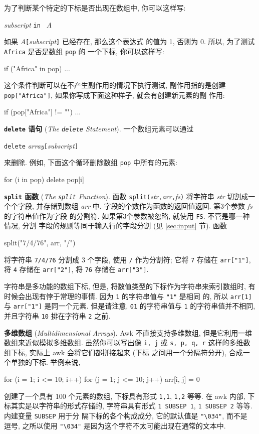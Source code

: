 为了判断某个特定的下标是否出现在数组中, 你可以这样写:
\begin{pattern}
    \textit{subscript} \verb'in ' \textit{A}
\end{pattern}
如果 \textit{A}\verb'['\textit{subscript}\verb']' 已经存在, 那么这个表达式
的值为 1, 否则为 0. 所以, 为了测试 \verb'Africa' 是否是数组 \verb'pop' 的
一个下标, 你可以这样写:
\begin{awkcode}
    if ("Africa" in pop) ...
\end{awkcode}
这个条件判断可以在不产生副作用的情况下执行测试, 副作用指的是创建
\verb'pop["Africa"]', 如果你写成下面这种样子, 就会有创建新元素的副
作用:
\begin{awkcode}
    if (pop["Africa"] != "") ...
\end{awkcode}

\textbf{\texttt{delete} 语句} (\emph{The \texttt{delete} Statement}).
一个数组元素可以通过
\begin{pattern}
    \verb'delete' \textit{array}\verb'['\textit{subscript}\verb']'
\end{pattern}
来删除. 例如, 下面这个循环删除数组 \verb'pop' 中所有的元素:
\begin{awkcode}
    for (i in pop)
        delete pop[i]
\end{awkcode}

\textbf{\texttt{split} 函数} (\emph{The \texttt{split} Function}). 函数
\verb'split('\textit{str}\verb','\textit{arr}\verb','\textit{fs}\verb')'
将字符串 \textit{str} 切割成一个个字段, 并存储到数组 \textit{arr} 中.
字段的个数作为函数的返回值返回. 第3个参数 \textit{fs} 的字符串值作为字段
的分割符. 如果第3个参数被忽略, 就使用 \verb'FS'. 不管是哪一种情况, 分割
字段的规则等同于输入行的字段分割 (见 \ref{sec:input} 节). 函数
\begin{awkcode}
    split("7/4/76", arr, "/")
\end{awkcode}
将字符串 \verb'7/4/76' 分割成 3 个字段, 使用 \verb'/' 作为分割符; 它将
\verb'7' 存储在 \verb'arr["1"]', 将 \verb'4' 存储在 \verb'arr["2"]',
将 \verb'76' 存储在 \verb'arr["3"]'.

字符串是多功能的数组下标, 但是, 将数值类型的下标作为字符串来索引数组时,
有时候会出现有悖于常理的事情. 因为 \verb'1' 的字符串值与 \verb'"1"' 是相同
的, 所以 \verb'arr[1]' 与 \verb'arr["1"]' 是同一个元素. 但是请注意,
\verb'01' 的字符串值与 \verb'1' 的字符串值并不相同, 并且字符串 \verb'10'
排在字符串 \verb'2' 之前.

\textbf{多维数组} (\emph{Multidimensional Arrays}). Awk 不直接支持多维数组,
但是它利用一维数组来近似模拟多维数组. 虽然你可以写出像 \verb'i, j' 或
\verb's, p, q, r' 这样的多维数组下标, 实际上 awk 会将它们都拼接起来 (下标
之间用一个分隔符分开), 合成一个单独的下标. 举例来说,
\begin{awkcode}
    for (i = 1; i <= 10; i++)
        for (j = 1; j <= 10; j++)
            arr[i, j] = 0
\end{awkcode}
创建了一个具有 100 个元素的数组, 下标具有形式 \verb'1,1', \verb'1,2' 等等.
在 awk 内部, 下标其实是以字符串的形式存储的, 字符串具有形式
\verb'1 SUBSEP 1', \verb'1 SUBSEP 2' 等等. 内建变量 \verb'SUBSEP' 用于分
隔下标的各个构成成分, 它的默认值是 \verb'"\034"', 而不是 逗号, 之所以使用
\verb'"\034"' 是因为这个字符不太可能出现在通常的文本中.

